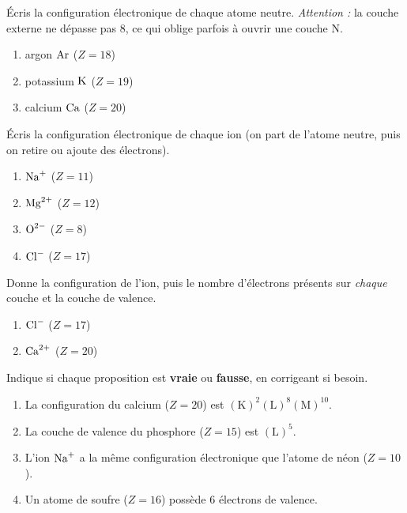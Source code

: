 \documentclass[11pt,a4paper]{article}
\begin{document}
\begin{exo}
Écris la configuration électronique de chaque atome neutre. \emph{Attention :} la couche externe ne
dépasse pas $8$, ce qui oblige parfois à ouvrir une couche N.
\begin{enumerate}[label=\alph*)]
  \item argon $\ce{Ar}$ ($Z = 18$)
  \item potassium $\ce{K}$ ($Z = 19$)
  \item calcium $\ce{Ca}$ ($Z = 20$)
\end{enumerate}
\end{exo}

\begin{exo}
Écris la configuration électronique de chaque ion (on part de l'atome neutre, puis on retire ou ajoute
des électrons).
\begin{enumerate}[label=\alph*)]
  \item $\ce{Na^{+}}$ ($Z = 11$)
  \item $\ce{Mg^{2+}}$ ($Z = 12$)
  \item $\ce{O^{2-}}$ ($Z = 8$)
  \item $\ce{Cl^{-}}$ ($Z = 17$)
\end{enumerate}
\end{exo}

\begin{exo}
Donne la configuration de l'ion, puis le nombre d'électrons présents sur \emph{chaque} couche et la
couche de valence.
\begin{enumerate}[label=\alph*)]
  \item $\ce{Cl^{-}}$ ($Z = 17$)
  \item $\ce{Ca^{2+}}$ ($Z = 20$)
\end{enumerate}
\end{exo}

\begin{exo}
Indique si chaque proposition est \textbf{vraie} ou \textbf{fausse}, en corrigeant si besoin.
\begin{enumerate}[label=\alph*)]
  \item La configuration du calcium ($Z=20$) est $(\mathrm{K})^2(\mathrm{L})^8(\mathrm{M})^{10}$.
  \item La couche de valence du phosphore ($Z=15$) est $(\mathrm{L})^5$.
  \item L'ion $\ce{Na^{+}}$ a la même configuration électronique que l'atome de néon ($Z=10$).
  \item Un atome de soufre ($Z=16$) possède $6$ électrons de valence.
\end{enumerate}
\end{exo}
\end{document}

